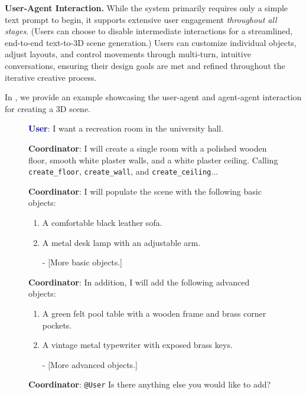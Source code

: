 \noindent\textbf{User-Agent Interaction.} While the system primarily requires only a simple text prompt to begin, it supports extensive user engagement \emph{throughout all stages}. (Users can choose to disable intermediate interactions for a streamlined, end-to-end text-to-3D scene generation.) Users can customize individual objects, adjust layouts, and control movements through multi-turn, intuitive conversations, ensuring their design goals are met and refined throughout the iterative creative process.



In , we provide an example showcasing the user-agent and agent-agent interaction for creating a 3D scene.
\begin{figure}[t]
    \centering
   

{\small \begin{tcolorbox}[colframe=black, colback=lightyellow, coltitle=black, left=2mm, right=2mm]

\textcolor{darkblue}{\textbf{User}:} I want a recreation room in the university hall.

\textcolor{darkpurple}{\textbf{Coordinator}:} I will create a single room with a polished wooden floor, smooth white plaster walls, and a white plaster ceiling. Calling \texttt{create\_floor}, \texttt{create\_wall}, and \texttt{create\_ceiling}...

\textcolor{darkpurple}{\textbf{Coordinator}:} I will populate the scene with the following basic objects:
\begin{enumerate}[label=-, noitemsep, topsep=0pt]
    \item A comfortable black leather sofa.
    \item A metal desk lamp with an adjustable arm.
    \item [-] [More basic objects.]
\end{enumerate}

\textcolor{darkpurple}{\textbf{Coordinator}:} In addition, I will add the following advanced objects:
\begin{enumerate}[label=-, noitemsep, topsep=0pt]
    \item A green felt pool table with a wooden frame and brass corner pockets. 
    \item A vintage metal typewriter with exposed brass keys.
    \item [-] [More advanced objects.]
\end{enumerate}

\textcolor{darkpurple}{\textbf{Coordinator}:}  \colorbox{darkyellow}{\texttt{@User}} Is there anything else you would like to add?


\end{tcolorbox}}
\end{figure}
